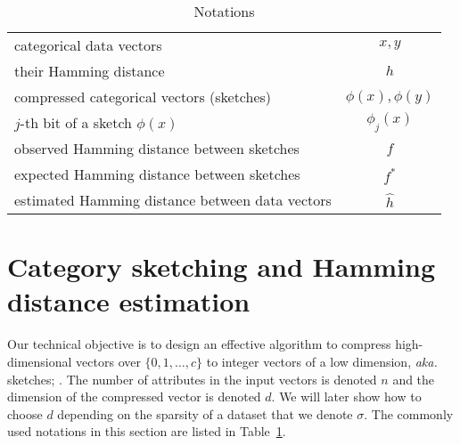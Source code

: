 \begin{table}[h]
    \centering
    \caption{Notations\label{tab:notations}}    
\noindent\begin{tabular}{lc}
    \hline
    categorical data vectors & $x,y$ \\
    their Hamming distance & $h$ \\
    \hline
    compressed categorical vectors (sketches) & $\phi(x), \phi(y)$ \\
    $j$-th bit of a sketch $\phi(x)$ & $\phi_j(x)$ \\
    observed Hamming distance between sketches & $f$ \\
    \hline
    expected Hamming distance between sketches & $f^*$\\
    estimated Hamming distance between data vectors & $\hat{h}$\\
    \hline
    \end{tabular}
\end{table}






\section{Category sketching and Hamming distance estimation}\label{sec:analysis}



Our technical objective is to design an effective algorithm to compress high-dimensional vectors over $\{0,1,\ldots, c\}$ to integer vectors of a low dimension, {\it aka.} sketches;  . The number of attributes in the input vectors is denoted $n$ and the dimension of the compressed vector is denoted $d$. We will later show how to choose $d$ depending on the sparsity of a dataset that we denote $\sigma$. The commonly used notations in this section are listed in Table~\ref{tab:notations}.

